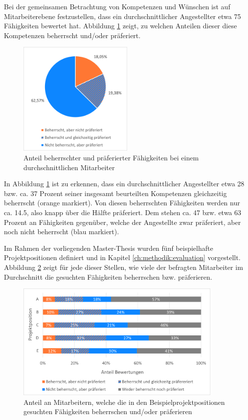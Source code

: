 Bei der gemeinsamen Betrachtung von Kompetenzen und Wünschen ist auf Mitarbeiterebene festzustellen, dass ein durchschnittlicher Angestellter etwa 75 Fähigkeiten bewertet hat. Abbildung \ref{fig:ergebnisse:analyse:abb3} zeigt, zu welchen Anteilen dieser diese Kompetenzen beherrscht und/oder präferiert.

\begin{figure}[h]
	\centering
	\includegraphics[width=0.5\textwidth]{gfx/auswertung-anteil-an-faehigkeiten.png}
	\caption{Anteil beherrschter und präferierter Fähigkeiten bei einem durchschnittlichen Mitarbeiter}
	\label{fig:ergebnisse:analyse:abb3}
\end{figure}

In Abbildung \ref{fig:ergebnisse:analyse:abb3} ist zu erkennen, dass ein durchschnittlicher Angestellter etwa 28 bzw. ca. 37 Prozent seiner insgesamt beurteilten Kompetenzen gleichzeitig beherrscht (orange markiert). Von diesen beherrschten Fähigkeiten werden nur ca. 14.5, also knapp über die Hälfte präferiert. Dem stehen ca. 47 bzw. etwa 63 Prozent an Fähigkeiten gegenüber, welche der Angestellte zwar präferiert, aber noch nicht beherrscht (blau markiert).

Im Rahmen der vorliegenden Master-Thesis wurden fünf beispielhafte Projektpositionen definiert und in Kapitel \ref{ch:methodik:evaluation} vorgestellt. Abbildung \ref{fig:ergebnisse:analyse:abb5} zeigt für jede dieser Stellen, wie viele der befragten Mitarbeiter im Durchschnitt die gesuchten Fähigkeiten beherrschen bzw. präferieren.

\begin{figure}[h]
	\centering
	\includegraphics[width=0.9\textwidth]{gfx/anteil-bewertungen-je-projektposition.png}
	\caption{Anteil an Mitarbeitern, welche die in den Beispielprojektpositionen gesuchten Fähigkeiten beherrschen und/oder präferieren}
	\label{fig:ergebnisse:analyse:abb5}
\end{figure}

